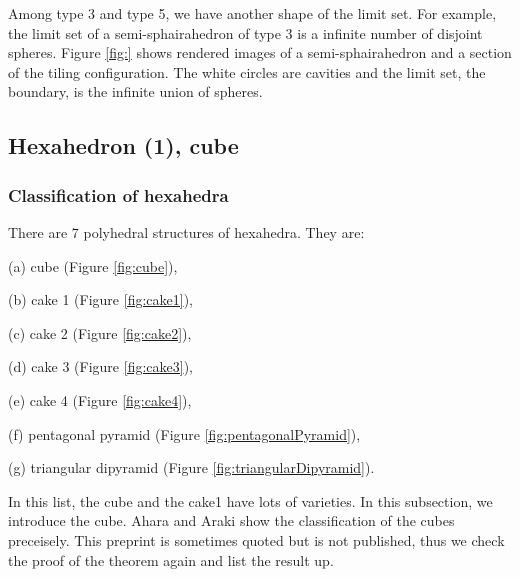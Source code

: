 \documentclass[suppldata, dvipdfmx]{interact}
\theoremstyle{plain}%
\theoremstyle{definition}
\theoremstyle{remark}
\theoremstyle{problemstyle}
\begin{document}
Among type 3 and type 5, we have another shape of the limit set.  For example, the limit set of a semi-sphairahedron of type 3 is a infinite number of disjoint spheres. Figure \ref{fig:} shows rendered images of a semi-sphairahedron and a section of the tiling configuration.  The white circles are cavities and the limit set, the boundary, is the infinite union of spheres.   
 




\subsection{Hexahedron (1), cube}

\subsubsection{Classification of hexahedra}


There are 7 polyhedral structures of hexahedra.  They are:\par
(a) cube (Figure \ref{fig:cube}),\par
(b) cake 1 (Figure \ref{fig:cake1}),\par
(c) cake 2 (Figure \ref{fig:cake2}),\par
(d) cake 3 (Figure \ref{fig:cake3}),\par
(e) cake 4 (Figure \ref{fig:cake4}),\par
(f) pentagonal pyramid (Figure \ref{fig:pentagonalPyramid}),\par
(g) triangular dipyramid (Figure \ref{fig:triangularDipyramid}).\par

In this list, the cube and the cake1 have lots of varieties.  In this subsection, we introduce the cube.  Ahara and Araki \cite{AharaAraki2} show the classification of the cubes preceisely.  This preprint is sometimes quoted but is not published, thus we check the proof of the theorem again and list the result up.
\end{document}
